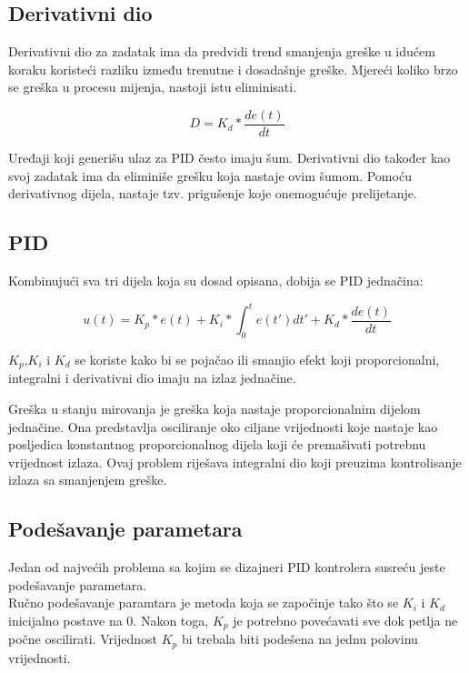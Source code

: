 \documentclass[../Document.tex]{subfiles}
\begin{document}
\subsection{Derivativni dio}
Derivativni dio za zadatak ima da predvidi trend smanjenja greške u idućem koraku koristeći razliku između trenutne i dosadašnje greške. Mjereći koliko brzo se greška u procesu mijenja, nastoji istu eliminisati.

$$
    D=K_d*\frac{de(t)}{dt}
$$

\noindent Uređaji koji generišu ulaz za PID često imaju šum. Derivativni dio također kao svoj zadatak ima da eliminiše grešku koja nastaje ovim šumom. Pomoću derivativnog dijela, nastaje tzv. prigušenje koje onemogućuje prelijetanje.
\clearpage

\subsection{PID}
Kombinujući sva tri dijela koja su dosad opisana, dobija se PID jednačina:

$$
    u(t)=K_p*e(t) + K_i*\int_{0}^{t}e(t')dt' + K_d*\frac{de(t)}{dt}
$$

\noindent $K_p$,$K_i$ i $K_d$ se koriste kako bi se pojačao ili smanjio efekt koji proporcionalni, integralni i derivativni dio imaju na izlaz jednačine.\\


\noindent Greška u stanju mirovanja je greška koja nastaje proporcionalnim dijelom jednačine. Ona predstavlja osciliranje oko ciljane vrijednosti koje nastaje kao posljedica konstantnog proporcionalnog dijela koji će premašivati potrebnu vrijednost izlaza. Ovaj problem riješava integralni dio koji preuzima kontrolisanje izlaza sa smanjenjem greške.


\subsection{Podešavanje parametara} \label{tuning}
Jedan od najvećih problema sa kojim se dizajneri PID kontrolera susreću jeste podešavanje parametara.\\

\noindent Ručno podešavanje paramtara je metoda koja se započinje tako što se $K_i$ i $K_d$ inicijalno postave na 0. Nakon toga, $K_p$ je potrebno povećavati sve dok petlja ne počne oscilirati. Vrijednost $K_p$ bi trebala biti podešena na jednu polovinu vrijednosti\cite{pidtuning}.
\end{document}
